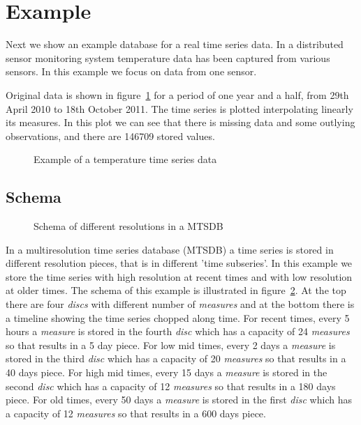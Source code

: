 \section{Example}

Next we show an example database for a real time series data.  In a
distributed sensor monitoring system temperature data has been
captured from various sensors. In this example we focus on data from
one sensor.  

Original data is shown in figure~\ref{fig:exemple:original} for a
period of one year and a half, from 29th April 2010 to 18th October
2011.  The time series is plotted interpolating linearly its measures.
In this plot we can see that there is missing data and some outlying
observations, and there are 146709 stored values.


\begin{figure}[tp]
  \centering
  
  \caption{Example of a temperature time series data}
  \label{fig:exemple:original}
\end{figure}



\subsection{Schema}

\begin{figure}[tp]
\centering

\caption{Schema of different resolutions in a MTSDB}
\label{fig:exemple:window}
\end{figure}


In a multiresolution time series database (MTSDB) a time series is
stored in different resolution pieces, that is in different 'time
subseries'.  In this example we store the time series with high
resolution at recent times and with low resolution at older times. The
schema of this example is illustrated in
figure~\ref{fig:exemple:window}. At the top there are four
\emph{discs} with different number of \emph{measures} and at the
bottom there is a timeline showing the time series chopped along
time. For recent times, every 5 hours a \emph{measure} is stored in
the fourth \emph{disc} which has a capacity of 24 \emph{measures} so
that results in a 5 day piece. For low mid times, every 2 days a
\emph{measure} is stored in the third \emph{disc} which has a capacity
of 20 \emph{measures} so that results in a 40 days piece. For high mid
times, every 15 days a \emph{measure} is stored in the second
\emph{disc} which has a capacity of 12 \emph{measures} so that results
in a 180 days piece. For old times, every 50 days a \emph{measure} is
stored in the first \emph{disc} which has a capacity of 12
\emph{measures} so that results in a 600 days piece.



